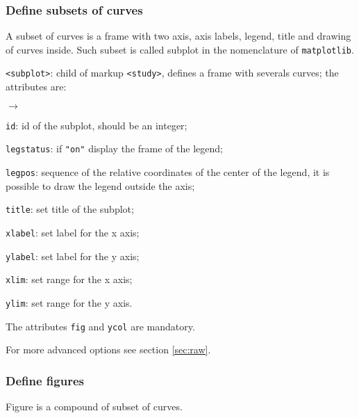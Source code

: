 \documentclass[a4paper,10pt,twoside]{csshortdoc}
\begin{document}
\subsubsection{Define subsets of curves}

A subset of curves is a frame with two axis, axis labels, legend, title and
drawing of curves inside. Such subset is called subplot in the nomenclature
of \texttt{matplotlib}.

\texttt{<subplot>}: child of markup \texttt{<study>}, defines a frame with
severals curves; the attributes are:
\begin{list}{$\rightarrow$}{}
\item \texttt{id}: id of the subplot, should be an integer;
\item \texttt{legstatus}: if \texttt{"on"} display the frame of the legend;
\item \texttt{legpos}: sequence of the relative coordinates of the center of
the legend, it is possible to draw the legend outside the axis;
\item \texttt{title}: set title of the subplot;
\item \texttt{xlabel}: set label for the x axis;
\item \texttt{ylabel}: set label for the y axis;
\item \texttt{xlim}: set range for the x axis;
\item \texttt{ylim}: set range for the y axis.
\end{list}

The attributes \texttt{fig} and \texttt{ycol} are mandatory.

For more advanced options see section \ref{sec:raw}.

\subsubsection{Define figures}

Figure is a compound of subset of curves.
\end{document}
